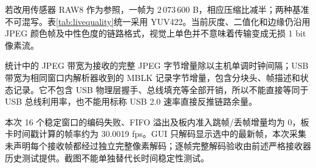 若改用传感器 RAW8 作为参照，一帧为 $2\,073\,600$ B，相应压缩比减半；两种基准不可混写。表\ref{tab:livequality}统一采用 YUV422。当前灰度、二值化和边缘仍沿用 JPEG 颜色帧及中性色度的链路格式，视觉上单色并不意味着传输变成无损 1 bit 像素流。

统计中的 JPEG 带宽为接收的完整 JPEG 字节增量除以主机单调时钟间隔；USB 带宽为相同窗口内解析器收到的 MBLK 记录字节增量，包含分块头、帧描述和状态记录。它不包含 USB 物理层握手、总线填充等全部开销，所以不能直接等同于 USB 总线利用率，也不能用标称 USB 2.0 速率直接反推链路余量。

本次 16 个稳定窗口的编码失败、FIFO 溢出及板内准入跳帧/丢帧增量均为 0，板卡时间戳计算的帧率约为 30.0019 fps。GUI 只解码显示选中的最新帧，本次采集未声明每个接收帧都经过独立完整像素解码；逐帧完整解码验收由前述严格接收器历史测试提供。截图不能单独替代长时间稳定性测试。
\clearpage
